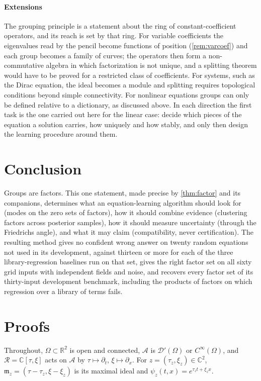 \documentclass[11pt]{article}
\theoremstyle{plain}
\theoremstyle{definition}
\theoremstyle{remark}
\newcommand{\R}{\mathbb{R}}
\newcommand{\C}{\mathbb{C}}
\newcommand{\ring}{\mathcal{R}}            %
\begin{document}
\paragraph{Extensions}
The grouping principle is a statement about the ring of constant-coefficient operators, and its reach is set by that
ring. For variable coefficients the eigenvalues read by the pencil become functions of position (\cref{rem:varcoef}) and
each group becomes a family of curves; the operators then form a non-commutative algebra in which factorization is not
unique, and a splitting theorem would have to be proved for a restricted class of coefficients. For systems, such as the
Dirac equation, the ideal becomes a module and splitting requires topological conditions beyond simple connectivity. For
nonlinear equations groups can only be defined relative to a dictionary, as discussed above. In each direction the
first task is the one carried out here for the linear case: decide which pieces of the equation a solution carries, how
uniquely and how stably, and only then design the learning procedure around them.

\section{Conclusion}\label{sec:conclusion}
Groups are factors. This one statement, made precise by \cref{thm:factor} and its companions, determines what an
equation-learning algorithm should look for (modes on the zero sets of factors), how it should combine evidence
(clustering factors across posterior samples), how it should measure uncertainty (through the Friedrichs angle), and
what it may claim (compatibility, never certification). The resulting method gives no confident wrong answer on twenty random equations not used in its
development, against thirteen or more for each of the three library-regression baselines run on that set, gives the right factor
set on all sixty grid inputs with independent fields and noise, and recovers every factor set of its
thirty-input development benchmark, including the products of factors on which regression over a library of terms fails.



\appendix

\section{Proofs}\label{app:proofs}
Throughout, $\Omega\subset\R^2$ is open and connected, $\mathcal A$ is $\mathcal D'(\Omega)$ or $C^\infty(\Omega)$, and
$\ring=\C[\tau,\xi]$ acts on $\mathcal A$ by $\tau\mapsto\partial_t$, $\xi\mapsto\partial_x$. For $z=(\tau_z,\xi_z)\in\C^2$,
$\mathfrak m_z=(\tau-\tau_z,\xi-\xi_z)$ is its maximal ideal and $\psi_z(t,x)=e^{\tau_zt+\xi_zx}$.
\end{document}
